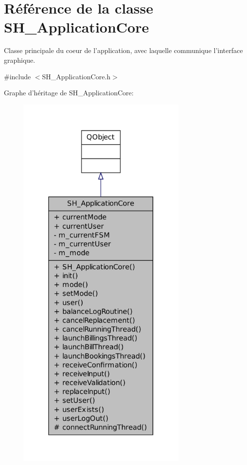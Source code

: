 \hypertarget{classSH__ApplicationCore}{\section{Référence de la classe S\-H\-\_\-\-Application\-Core}
\label{classSH__ApplicationCore}
}


Classe principale du coeur de l'application, avec laquelle communique l'interface graphique.  




{\ttfamily \#include $<$S\-H\-\_\-\-Application\-Core.\-h$>$}



Graphe d'héritage de S\-H\-\_\-\-Application\-Core\-:\nopagebreak
\begin{figure}[H]
\begin{center}
\leavevmode
\includegraphics[height=550pt]{classSH__ApplicationCore__inherit__graph}
\end{center}
\end{figure}


